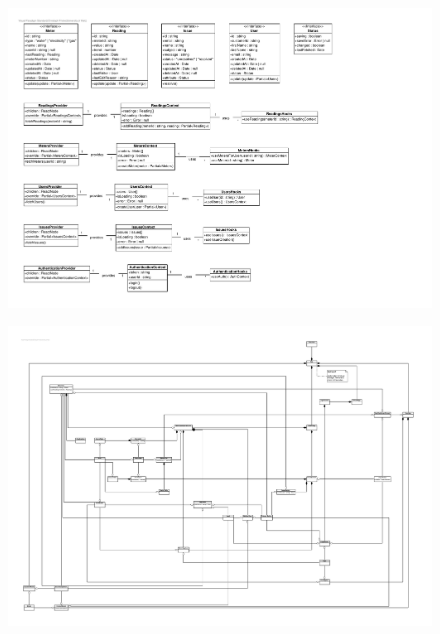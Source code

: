 \begin{figure}[h]
	\hspace{-3cm}
	\includegraphics[scale = 0.9]{./img/Diagrams/providers-classDiagram}
\end{figure}

\begin{figure}[h]
	\hspace{-3cm}
	\includegraphics[scale = 0.73]{./img/Diagrams/web-class}
\end{figure}